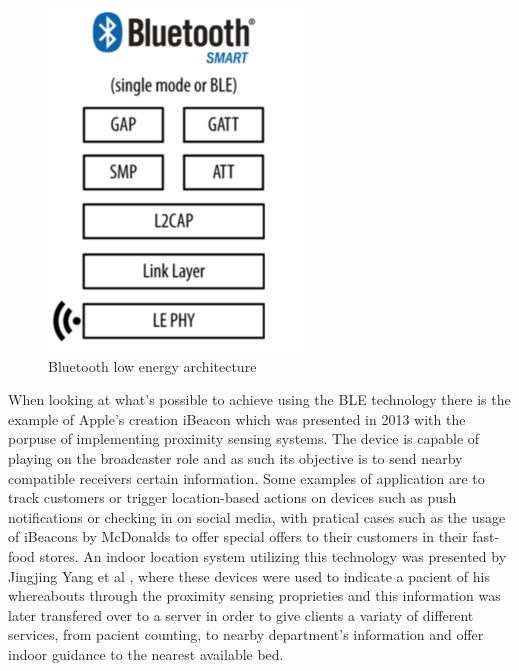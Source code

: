 \documentclass[a4paper]{IEEEtran}
\begin{document}
 \begin{figure}[htp]
	\centering
		\includegraphics[width=0.5\linewidth]{figures/BLEArchitecture.png}
	\caption[Bluetooth Low Energy Architecture]{Bluetooth low energy architecture}
	\label{fig:BLEarchitecture}
\end{figure}


When looking at what's possible to achieve using the BLE technology there is the example of Apple's creation iBeacon \cite{ibeacon} which was presented in 2013 with the porpuse of implementing proximity sensing systems. The device is capable of playing on the broadcaster role and as such its objective is to send nearby compatible receivers certain information. Some examples of application are to track customers or trigger location-based actions on devices such as push notifications or checking in on social media, with pratical cases such as the usage of iBeacons by McDonalds to offer special offers to their customers in their fast-food stores. An indoor location system utilizing this technology was presented by Jingjing Yang et al \cite{ibeacon1}, where these devices were used to indicate a pacient of his whereabouts through the proximity sensing proprieties and this information was later transfered over to a server in order to give clients a variaty of different services, from pacient counting, to nearby department's information and offer indoor guidance to the nearest available bed. 
\end{document}
